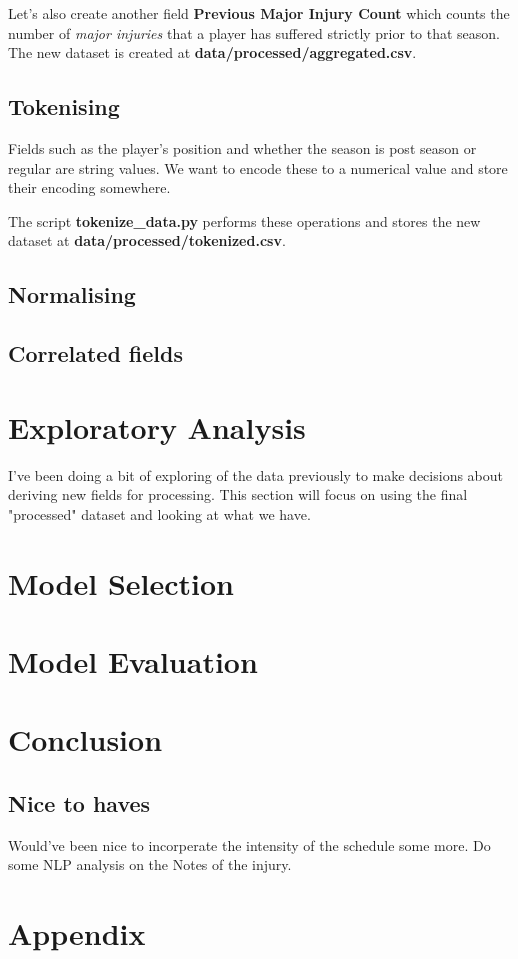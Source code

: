 \documentclass{article}
\begin{document}
Let's also create another field \textbf{Previous Major Injury Count} which counts the 
number of \emph{major injuries} that a player has suffered strictly prior to that season.
The new dataset is created at \textbf{data/processed/aggregated.csv}.

\subsection*{Tokenising}

Fields such as the player's position and whether the season is post season 
or regular are string values. We want to encode these to a numerical value and 
store their encoding somewhere.

The script \textbf{tokenize\_data.py} performs these operations and stores the
new dataset at \textbf{data/processed/tokenized.csv}.

\subsection*{Normalising}

\subsection*{Correlated fields}

\newpage
\section*{Exploratory Analysis}

I've been doing a bit of exploring of the data previously to 
make decisions about deriving new fields for processing. 
This section will focus on using the final "processed" dataset
and looking at what we have.

\section*{Model Selection}

\section*{Model Evaluation}

\section*{Conclusion}

\subsection*{Nice to haves}

Would've been nice to incorperate the intensity of the schedule some more.
Do some NLP analysis on the Notes of the injury.

\section*{Appendix}
\label{appendix:}
\end{document}
